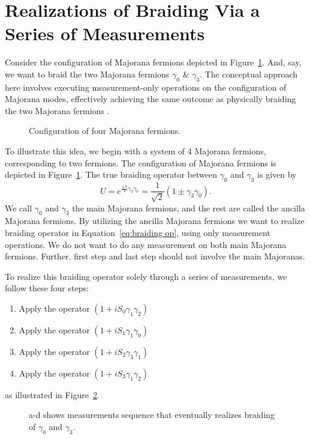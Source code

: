 \documentclass{article}
\begin{document}
\section{Realizations of Braiding Via a Series of Measurements} %
\label{sec:Realizations of Braiding Via a Series of Measurements}
Consider the configuration of Majorana fermions depicted in Figure~\ref{fig:4 mf conf}. And, say, we want to braid the two Majorana fermions $ \gamma_0 $ \& $ \gamma_3 $. The conceptual approach here involves executing measurement-only operations on the configuration of Majorana modes, effectively achieving the same outcome as physically braiding the two Majorana fermions \cite{Leijnse_2012}.
\begin{figure}
	\begin{center}
		
	\end{center}
	\caption{Configuration of four Majorana fermions.}
	\label{fig:4 mf conf}
\end{figure}
To illustrate this idea, we begin with a system of 4 Majorana fermions, corresponding to two fermions. The configuration of Majorana fermions is depicted in Figure~\ref{fig:4 mf conf}. The true braiding operator between $\gamma_0$ and $\gamma_3$ is given by
\begin{equation}
	U = e^{\frac{\pm \pi}{4} \gamma_3 \gamma_0} = \frac{1}{\sqrt{2}} (1 \pm \gamma_3 \gamma_0).
	\label{eq:braiding op}
\end{equation}
We call $ \gamma_0 $ and $ \gamma_3 $ the main Majorana fermions, and the rest are called the ancilla Majorana fermions. By utilizing the ancilla Majorana fermions we want to realize braiding operator in Equation~\ref{eq:braiding op}, using only measurement operations. We do not want to do any measurement on both main Majorana fermions. Further, first step and last step should not involve the main Majoranas.

To realize this braiding operator solely through a series of measurements, we follow these four steps:
\begin{enumerate}
	\item Apply the operator $ (1 + iS_0 \gamma_1 \gamma_2) $
	\item Apply the operator $ (1 + iS_1 \gamma_1 \gamma_0) $
	\item Apply the operator $ (1 + iS_2 \gamma_3 \gamma_1) $
	\item Apply the operator $ (1 + iS_3 \gamma_1 \gamma_2) $
\end{enumerate}
as illustrated in Figure~\ref{fig:meas 4 mfs}.
\begin{figure}
	\begin{center}
		
	\end{center}
	\caption{a-d shows measurements sequence that eventually realizes braiding of $ \gamma_0 $ and $ \gamma_3 $.}
	\label{fig:meas 4 mfs}
\end{figure}
\end{document}
